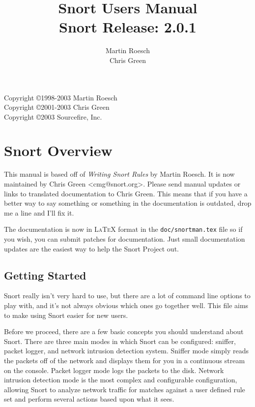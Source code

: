 \documentclass[english]{report}
\begin{document}
\title{Snort Users Manual\\
Snort Release: 2.0.1}


\author{Martin Roesch \\ Chris Green}
\maketitle
Copyright \copyright 1998-2003 Martin Roesch \\
Copyright \copyright 2001-2003 Chris Green \\
Copyright \copyright 2003 Sourcefire, Inc.

\tableofcontents{}


\chapter{Snort Overview}

This manual is based off of \emph{Writing Snort Rules} by Martin Roesch.
It is now maintained by Chris Green <cmg@snort.org>. Please send manual
updates or links to translated documentation to Chris Green. This
means that if you have a better way to say something or something
in the documentation is outdated, drop me a line and I'll fix it.

The documentation is now in \textsc{LaTeX} format in the
\verb!doc/snortman.tex! file so if you wish, you can submit patches for documentation.
Just small documentation updates are the easiest way to help the Snort
Project out.

\section{Getting Started}

Snort really isn't very hard to use, but there are a lot of command
line options to play with, and it's not always obvious which ones go
together well. This file aims to make using Snort easier for new
users.

Before we proceed, there are a few basic concepts you should understand
about Snort. There are three main modes in which Snort can be configured:
sniffer, packet logger, and network intrusion detection system. Sniffer
mode simply reads the packets off of the network and displays them
for you in a continuous stream on the console. Packet logger mode
logs the packets to the disk. Network intrusion detection mode is
the most complex and configurable configuration, allowing Snort to
analyze network traffic for matches against a user defined rule set
and perform several actions based upon what it sees.
\end{document}
